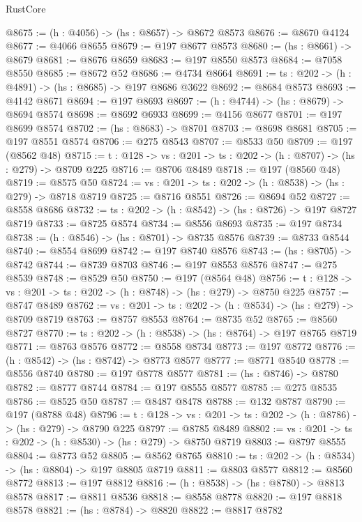 \begin{lexlean}{RustCore}
\begin{coremodule}
@8675 := (h : @4056) -> (hs : @8657) -> @8672 @8573
@8676 := @8670 @4124
@8677 := @4066 @8655
@8679 := @197 @8677 @8573
@8680 := (hs : @8661) -> @8679
@8681 := @8676 @8659
@8683 := @197 @8550 @8573
@8684 := @7058 @8550
@8685 := @8672 @52
@8686 := @4734 @8664
@8691 := {ts : @202} -> (h : @4891) -> (hs : @8685) -> @197 @8686 @3622
@8692 := @8684 @8573
@8693 := @4142 @8671
@8694 := @197 @8693
@8697 := (h : @4744) -> (hs : @8679) -> @8694 @8574
@8698 := @8692 @6933
@8699 := @4156 @8677
@8701 := @197 @8699 @8574
@8702 := (hs : @8683) -> @8701
@8703 := @8698 @8681
@8705 := @197 @8551 @8574
@8706 := @275 @8543
@8707 := @8533 @50
@8709 := @197 (@8562 @48)
@8715 := {t : @128} -> {vs : @201} -> {ts : @202} -> (h : @8707) -> (hs : @279) -> @8709 @225
@8716 := @8706 @8489
@8718 := @197 (@8560 @48)
@8719 := @8575 @50
@8724 := {vs : @201} -> {ts : @202} -> (h : @8538) -> (hs : @279) -> @8718 @8719
@8725 := @8716 @8551
@8726 := @8694 @52
@8727 := @8558 @8686
@8732 := {ts : @202} -> (h : @8542) -> (hs : @8726) -> @197 @8727 @8719
@8733 := @8725 @8574
@8734 := @8556 @8693
@8735 := @197 @8734
@8738 := (h : @8546) -> (hs : @8701) -> @8735 @8576
@8739 := @8733 @8544
@8740 := @8554 @8699
@8742 := @197 @8740 @8576
@8743 := (hs : @8705) -> @8742
@8744 := @8739 @8703
@8746 := @197 @8553 @8576
@8747 := @275 @8539
@8748 := @8529 @50
@8750 := @197 (@8564 @48)
@8756 := {t : @128} -> {vs : @201} -> {ts : @202} -> (h : @8748) -> (hs : @279) -> @8750 @225
@8757 := @8747 @8489
@8762 := {vs : @201} -> {ts : @202} -> (h : @8534) -> (hs : @279) -> @8709 @8719
@8763 := @8757 @8553
@8764 := @8735 @52
@8765 := @8560 @8727
@8770 := {ts : @202} -> (h : @8538) -> (hs : @8764) -> @197 @8765 @8719
@8771 := @8763 @8576
@8772 := @8558 @8734
@8773 := @197 @8772
@8776 := (h : @8542) -> (hs : @8742) -> @8773 @8577
@8777 := @8771 @8540
@8778 := @8556 @8740
@8780 := @197 @8778 @8577
@8781 := (hs : @8746) -> @8780
@8782 := @8777 @8744
@8784 := @197 @8555 @8577
@8785 := @275 @8535
@8786 := @8525 @50
@8787 := @8487 @8478
@8788 := @132 @8787
@8790 := @197 (@8788 @48)
@8796 := {t : @128} -> {vs : @201} -> {ts : @202} -> (h : @8786) -> (hs : @279) -> @8790 @225
@8797 := @8785 @8489
@8802 := {vs : @201} -> {ts : @202} -> (h : @8530) -> (hs : @279) -> @8750 @8719
@8803 := @8797 @8555
@8804 := @8773 @52
@8805 := @8562 @8765
@8810 := {ts : @202} -> (h : @8534) -> (hs : @8804) -> @197 @8805 @8719
@8811 := @8803 @8577
@8812 := @8560 @8772
@8813 := @197 @8812
@8816 := (h : @8538) -> (hs : @8780) -> @8813 @8578
@8817 := @8811 @8536
@8818 := @8558 @8778
@8820 := @197 @8818 @8578
@8821 := (hs : @8784) -> @8820
@8822 := @8817 @8782

\end{coremodule}
\end{lexlean}
